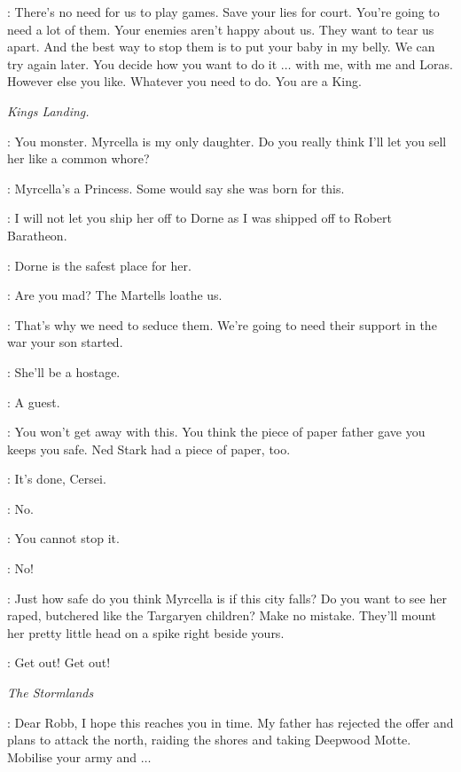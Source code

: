 \MARGAERY: There's no need for us to play games. Save your lies for court. You're going to need a lot of them. Your enemies aren't happy about us. They want to tear us apart. And the best way to stop them is to put your baby in my belly. We can try again later. You decide how you want to do it $\ldots$ with me, with me and Loras. However else you like. Whatever you need to do. You are a King. 


\scene

\textit{Kings Landing.} 


\CERSEI: You monster. Myrcella is my only daughter. Do you really think I'll let you sell her like a common whore? 

\TYRION: Myrcella's a Princess. Some would say she was born for this. 

\CERSEI: I will not let you ship her off to Dorne as I was shipped off to Robert Baratheon. 

\TYRION: Dorne is the safest place for her. 

\CERSEI: Are you mad? The Martells loathe us. 

\TYRION: That's why we need to seduce them. We're going to need their support in the war your son started. 

\CERSEI: She'll be a hostage. 

\TYRION: A guest. 

\CERSEI: You won't get away with this. You think the piece of paper father gave you keeps you safe. Ned Stark had a piece of paper, too. 

\TYRION: It's done, Cersei. 

\CERSEI: No. 

\TYRION: You cannot stop it. 

\CERSEI: No! 


\TYRION: Just how safe do you think Myrcella is if this city falls? Do you want to see her raped, butchered like the Targaryen children? Make no mistake. They'll mount her pretty little head on a spike right beside yours. 

\CERSEI: Get out! Get out! 


\scene

\textit{The Stormlands} 


\THEON: Dear Robb, I hope this reaches you in time. My father has rejected the offer and plans to attack the north, raiding the shores and taking Deepwood Motte. Mobilise your army and $\ldots$ 

